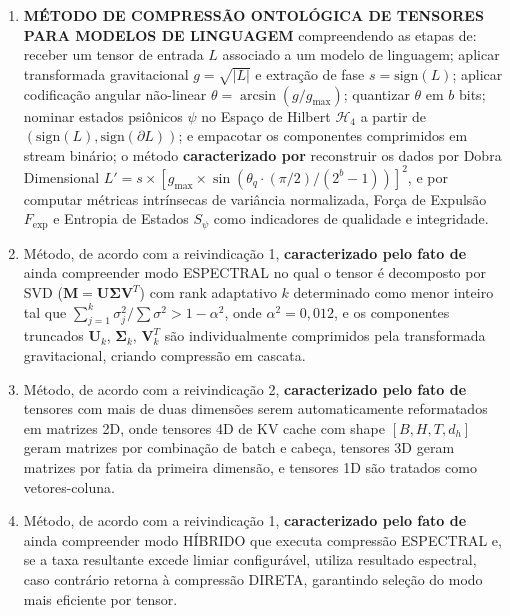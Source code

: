 \documentclass[12pt,a4paper]{article}
\begin{document}
\begin{enumerate}[leftmargin=*, label=\textbf{\arabic*.}]

\item \textbf{MÉTODO DE COMPRESSÃO ONTOLÓGICA DE TENSORES PARA MODELOS DE LINGUAGEM} compreendendo as etapas de: receber um tensor de entrada $L$ associado a um modelo de linguagem; aplicar transformada gravitacional $g = \sqrt{|L|}$ e extração de fase $s = \text{sign}(L)$; aplicar codificação angular não-linear $\theta = \arcsin(g/g_{\max})$; quantizar $\theta$ em $b$ bits; nominar estados psiônicos $\psi$ no Espaço de Hilbert $\mathcal{H}_4$ a partir de $(\text{sign}(L), \text{sign}(\partial L))$; e empacotar os componentes comprimidos em stream binário; o método \textbf{caracterizado por} reconstruir os dados por Dobra Dimensional $L' = s \times [g_{\max} \times \sin(\theta_q \cdot (\pi/2) / (2^b - 1))]^2$, e por computar métricas intrínsecas de variância normalizada, Força de Expulsão $F_{\text{exp}}$ e Entropia de Estados $S_\psi$ como indicadores de qualidade e integridade.

\item Método, de acordo com a reivindicação 1, \textbf{caracterizado pelo fato de} ainda compreender modo ESPECTRAL no qual o tensor é decomposto por SVD ($\mathbf{M} = \mathbf{U}\boldsymbol{\Sigma}\mathbf{V}^T$) com rank adaptativo $k$ determinado como menor inteiro tal que $\sum_{j=1}^{k} \sigma_j^2 / \sum \sigma^2 > 1 - \alpha^2$, onde $\alpha^2 = 0{,}012$, e os componentes truncados $\mathbf{U}_k$, $\boldsymbol{\Sigma}_k$, $\mathbf{V}_k^T$ são individualmente comprimidos pela transformada gravitacional, criando compressão em cascata.

\item Método, de acordo com a reivindicação 2, \textbf{caracterizado pelo fato de} tensores com mais de duas dimensões serem automaticamente reformatados em matrizes 2D, onde tensores 4D de KV cache com shape $[B, H, T, d_h]$ geram matrizes por combinação de batch e cabeça, tensores 3D geram matrizes por fatia da primeira dimensão, e tensores 1D são tratados como vetores-coluna.

\item Método, de acordo com a reivindicação 1, \textbf{caracterizado pelo fato de} ainda compreender modo HÍBRIDO que executa compressão ESPECTRAL e, se a taxa resultante excede limiar configurável, utiliza resultado espectral, caso contrário retorna à compressão DIRETA, garantindo seleção do modo mais eficiente por tensor.


\end{enumerate}
\end{document}
